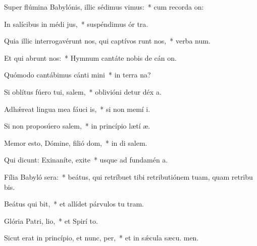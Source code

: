 \item Super flúmina Babylónis, illic sédimus  vimus:~* cum recorda on:
\item In salícibus in médi jus,~* suspéndimus ór tra.
\item Quia illic interrogavérunt nos, qui captívos runt nos,~* verba num.
\item Et qui abrunt nos:~* Hymnum cantáte nobis de cán on.
\item Quómodo cantábimus cánti mini~* in terra na?
\item Si oblítus fúero tui, salem,~* oblivióni detur déx a.
\item Adhǽreat lingua mea fáuci is,~* si non memí i.
\item Si non proposúero salem,~* in princípio lætí æ.
\item Memor esto, Dómine, filió dom,~* in di salem.
\item Qui dicunt: Exinaníte, exite~* usque ad fundamén  a.
\item Fília Babyló sera:~* beátus, qui retríbuet tibi retributiónem tuam, quam retribu bis.
\item Beátus qui bit,~* et allídet párvulos tu  tram.
\item Glória Patri,  lio,~* et Spirí to.
\item Sicut erat in princípio, et nunc,  per,~* et in sǽcula sæcu. men.
